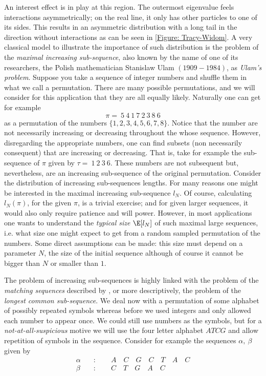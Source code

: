 An interest effect is in play at this region. The outermost eigenvalue feels interactions asymmetrically; on the real line, it only has other particles to one of its sides. This results in an asymmetric distribution with a long tail in the direction without interactions as can be seen in  \autoref{Figure: Tracy-Widom}. A very classical model to illustrate the importance of such distribution is the problem of the \textit{maximal increasing sub-sequence}, also known by the name of one of its researchers, the Polish mathematician Stanislaw Ulam $(1909 - 1984)$, as \textit{Ulam's problem}. Suppose you take a sequence of integer numbers and shuffle them in what we call a permutation. There are many possible permutations, and we will consider for this application that they are all equally likely. Naturally one can get for example
\begin{equation}
	\pi = ~5~4~1~7~2~3~8~6
\end{equation}
as a permutation of the numbers $\{1, 2, 3, 4, 5, 6, 7, 8\}$. Notice that the number are not necessarily increasing or decreasing throughout the whose sequence. However, disregarding the appropriate numbers, one can find subsets (non necessarily consequent) that are increasing or decreasing. That is, take for example the sub-sequence of $\pi$ given by $\tau = ~1~2~3~6$. These numbers are not subsequent but, nevertheless, are an increasing sub-sequence of the original permutation. Consider the distribution of increasing sub-sequences lengths. For many reasons one might be interested in the maximal increasing sub-sequence $l_N$. Of course, calculating $l_N(\pi)$, for the given $\pi$, is a trivial exercise; and for given larger sequences, it would also only require patience and will power. However, in most applications one wants to understand the \textit{typical size} $\E[l_N]$ of such maximal large sequences, i.e. what size one might expect to get from a random sampled permutation of the numbers. Some direct assumptions can be made: this size must depend on a parameter $N$, the size of the initial sequence although of course it cannot be bigger than $N$ or smaller than $1$.

The problem of increasing sub-sequences is highly linked with the problem of the \textit{matching sequences} described by , or more descriptively, the problem of the \textit{longest common sub-sequence}. We deal now with a permutation of some alphabet of possibly repeated symbols whereas before we used integers and only allowed each number to appear once. We could still use numbers as the symbols, but for a \textit{not-at-all-suspicious} motive we will use the four letter alphabet $ATCG$ and allow repetition of symbols in the sequence. Consider for example the sequences $\alpha,~\beta$ given by
\begin{align}
	\alpha \quad & : \qquad A \quad C \quad G \quad C \quad T \quad A \quad C \\
	\beta \quad & : \qquad C \quad T \quad G \quad A \quad C
\end{align}

